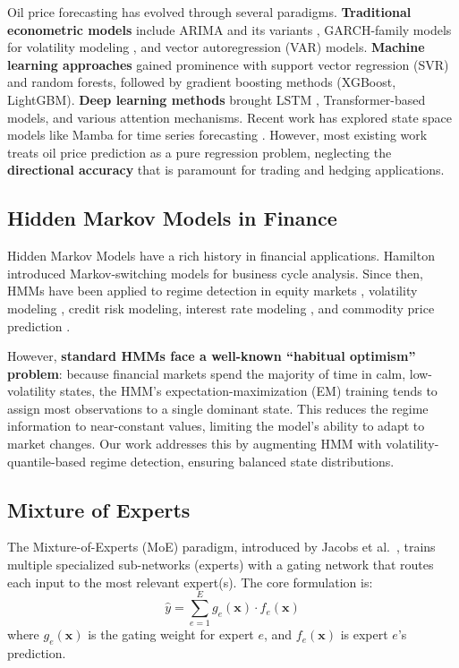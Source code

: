 \documentclass[3p,times]{elsarticle}
\begin{document}
Oil price forecasting has evolved through several paradigms. \textbf{Traditional econometric models} include ARIMA and its variants \cite{baumeister2015}, GARCH-family models for volatility modeling \cite{aloui2010}, and vector autoregression (VAR) models. \textbf{Machine learning approaches} gained prominence with support vector regression (SVR) and random forests, followed by gradient boosting methods (XGBoost, LightGBM). \textbf{Deep learning methods} brought LSTM \cite{wang2016}, Transformer-based models, and various attention mechanisms. Recent work has explored state space models like Mamba \cite{gu2023mamba} for time series forecasting \cite{cai2024,liang2024}. However, most existing work treats oil price prediction as a pure regression problem, neglecting the \textbf{directional accuracy} that is paramount for trading and hedging applications.

\subsection{Hidden Markov Models in Finance}

Hidden Markov Models have a rich history in financial applications. Hamilton \cite{hamilton1989} introduced Markov-switching models for business cycle analysis. Since then, HMMs have been applied to regime detection in equity markets \cite{bulla2011,nystrup2019}, volatility modeling \cite{haas2004}, credit risk modeling, interest rate modeling \cite{elliott2007}, and commodity price prediction \cite{alizadeh2008,he2019}.

However, \textbf{standard HMMs face a well-known ``habitual optimism'' problem}: because financial markets spend the majority of time in calm, low-volatility states, the HMM's expectation-maximization (EM) training tends to assign most observations to a single dominant state. This reduces the regime information to near-constant values, limiting the model's ability to adapt to market changes. Our work addresses this by augmenting HMM with volatility-quantile-based regime detection, ensuring balanced state distributions.

\subsection{Mixture of Experts}

The Mixture-of-Experts (MoE) paradigm, introduced by Jacobs et al.\ \cite{jacobs1991}, trains multiple specialized sub-networks (experts) with a gating network that routes each input to the most relevant expert(s). The core formulation is:
\begin{equation}
\hat{y} = \sum_{e=1}^{E} g_e(\mathbf{x}) \cdot f_e(\mathbf{x})
\end{equation}
where $g_e(\mathbf{x})$ is the gating weight for expert $e$, and $f_e(\mathbf{x})$ is expert $e$'s prediction.
\end{document}

